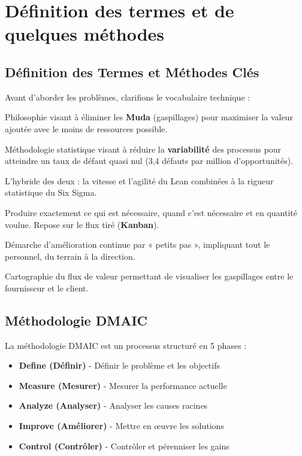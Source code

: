 \documentclass[11pt,a4paper]{article}
\begin{document}
\newpage
\section{Définition des termes et de quelques méthodes}

\subsection{Définition des Termes et Méthodes Clés}

Avant d'aborder les problèmes, clarifions le vocabulaire technique :

\begin{description}[leftmargin=2cm,style=nextline,itemsep=0.5em]
  \item[\textbf{Lean Manufacturing}] Philosophie visant à éliminer les \textbf{Muda} (gaspillages) pour maximiser la valeur ajoutée avec le moins de ressources possible.
  
  \item[\textbf{Six Sigma}] Méthodologie statistique visant à réduire la \textbf{variabilité} des processus pour atteindre un taux de défaut quasi nul (3,4 défauts par million d'opportunités).
  
  \item[\textbf{Lean Six Sigma (LSS)}] L'hybride des deux : la vitesse et l'agilité du Lean combinées à la rigueur statistique du Six Sigma.
  
  \item[\textbf{Just-In-Time (JIT)}] Produire exactement ce qui est nécessaire, quand c'est nécessaire et en quantité voulue. Repose sur le flux tiré (\textbf{Kanban}).
  
  \item[\textbf{Kaizen}] Démarche d'amélioration continue par « petits pas », impliquant tout le personnel, du terrain à la direction.
  
  \item[\textbf{VSM (Value Stream Mapping)}] Cartographie du flux de valeur permettant de visualiser les gaspillages entre le fournisseur et le client.
\end{description}

\subsection{Méthodologie DMAIC}

La méthodologie DMAIC est un processus structuré en 5 phases :

\begin{itemize}[leftmargin=*,itemsep=0.3em]
  \item \textbf{Define (Définir)} - Définir le problème et les objectifs
  \item \textbf{Measure (Mesurer)} - Mesurer la performance actuelle
  \item \textbf{Analyze (Analyser)} - Analyser les causes racines
  \item \textbf{Improve (Améliorer)} - Mettre en œuvre les solutions
  \item \textbf{Control (Contrôler)} - Contrôler et pérenniser les gains
\end{itemize}
\end{document}
